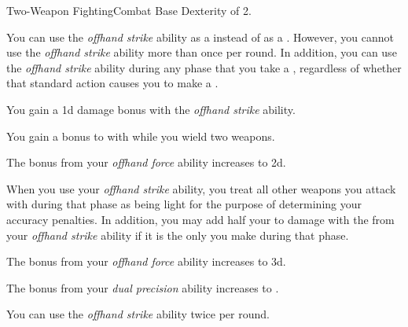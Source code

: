     \begin{feat}{Two-Weapon Fighting}{Combat}
        \featpre Base Dexterity of 2.

         You can use the \textit{offhand strike} ability as a  instead of as a .
        However, you cannot use the \textit{offhand strike} ability more than once per round.
        In addition, you can use the \textit{offhand strike} ability during any phase that you take a , regardless of whether that standard action causes you to make a .

         You gain a \plus1d damage bonus with the \textit{offhand strike} ability.

         You gain a  bonus to  with  while you wield two weapons.

         The bonus from your \textit{offhand force} ability increases to \plus2d.

         When you use your \textit{offhand strike} ability, you treat all other weapons you attack with during that phase as being light for the purpose of determining your accuracy penalties.
        In addition, you may add half your  to damage with the  from your \textit{offhand strike} ability if it is the only  you make during that phase.

         The bonus from your \textit{offhand force} ability increases to \plus3d.

         The bonus from your \textit{dual precision} ability increases to .

         You can use the \textit{offhand strike} ability twice per round.
    \end{feat}

